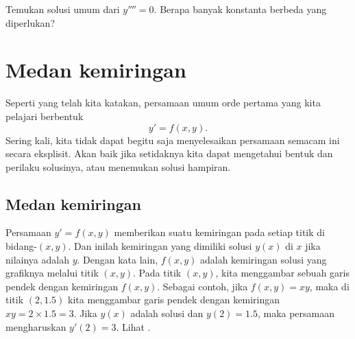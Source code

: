 \begin{exercise}
Temukan solusi umum dari $y''''= 0$.  Berapa banyak konstanta berbeda yang diperlukan?
\end{exercise}


\sectionnewpage
\section{Medan kemiringan}
\label{slopefields:section}



%

Seperti yang telah kita katakan, persamaan umum orde pertama yang kita pelajari berbentuk
\begin{equation*}
y' = f(x,y).
\end{equation*}
Sering kali, kita tidak dapat begitu saja menyelesaikan persamaan semacam ini secara eksplisit.
Akan baik jika setidaknya kita dapat mengetahui bentuk dan perilaku
solusinya, atau menemukan solusi hampiran.

\subsection{Medan kemiringan}

Persamaan $y' = f(x,y)$
memberikan suatu kemiringan pada setiap titik
di
bidang-$(x,y)$.  Dan inilah kemiringan yang dimiliki solusi $y(x)$
di $x$ jika nilainya adalah $y$.  Dengan kata lain, $f(x,y)$ adalah kemiringan
solusi yang grafiknya melalui
titik $(x,y)$.  Pada titik $(x,y)$, kita menggambar sebuah garis pendek
dengan kemiringan $f(x,y)$.
Sebagai contoh, jika $f(x,y) = xy$, maka di titik $(2,1.5)$ kita menggambar
garis pendek dengan kemiringan $xy = 2 \times 1.5 = 3$.  Jika $y(x)$ adalah solusi
dan $y(2) = 1.5$, maka persamaan mengharuskan $y'(2) = 3$.
Lihat .

\begin{myfig}
\capstart
{}
\caption{Kemiringan $y'=xy$ di $(2,1.5)$.\label{1.3:fig0}}
\end{myfig}

